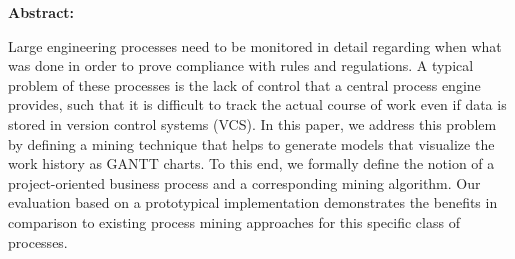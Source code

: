 \bigskip

{\noindent\bfseries \Large Abstract: \medskip}


	Large engineering processes need to be monitored in detail regarding when what was done in order to prove compliance with rules and regulations. A typical problem of these processes is the lack of control that a central process engine provides, such that it is difficult to track the actual course of work even if data is stored in version control systems (VCS). In this paper, we address this problem by defining a mining technique that helps to generate models that visualize the work history as GANTT charts. To this end, we formally define the notion of a project-oriented business process and a corresponding mining algorithm. Our evaluation based on a prototypical implementation demonstrates the benefits in comparison to existing process mining approaches for this specific class of processes.


\pagebreak



%








